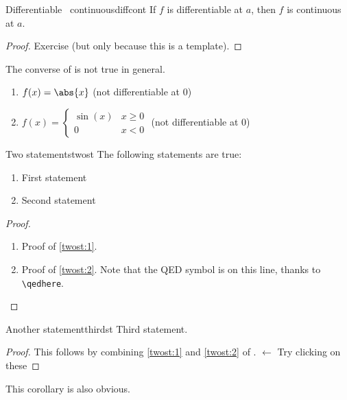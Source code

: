 \documentclass{article}
\begin{document}
\begin{proposition}{Differentiable \implies\ continuous}{diffcont}
If $f$ is differentiable at $a$, then $f$ is continuous at $a$.
\end{proposition}
\begin{proof}
Exercise (but only because this is a template).
\end{proof}

The converse of  is not true in general.

\begin{examples}\leavevmode %
\begin{enumerate}
    \item $f(x)=\abs{x}$ \hfill (not differentiable at $0$)
    \item $f(x)=\begin{cases} \sin(x) & x\ge 0 \\ 0 & x<0 \end{cases}$ \hfill (not differentiable at $0$)
\end{enumerate}
\end{examples}

\begin{theorem}{Two statements}{twost}
The following statements are true:
\begin{enumerate}[ref={(\arabic*)}]
    \item\label{twost:1} First statement
    \item\label{twost:2} Second statement
\end{enumerate}
\end{theorem}
\begin{proof}%
\begin{enumerate}
    \item Proof of \ref{twost:1}.
    \item Proof of \ref{twost:2}. Note that the QED symbol is on this line, thanks to \verb!\qedhere!. \qedhere %
\end{enumerate}
\end{proof}

\begin{corollary}{Another statement}{thirdst}
Third statement.
\end{corollary}
\begin{proof}
This follows by combining \ref{twost:1} and \ref{twost:2} of . $\gets$ \scriptsize{\textsf{Try clicking on these}}
\end{proof}
\begin{remark}
This corollary is also obvious.
\end{remark}
\end{document}
